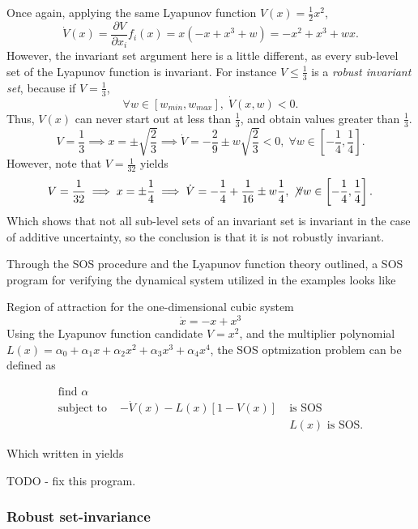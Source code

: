 Once again, applying the same Lyapunov function \(V(x) = \frac{1}{2}x^2\),
\[
  \dot{V}(x) = \frac{\partial V}{\partial x_i} f_i(x) = x(-x + x^3 + w) = -x^2 +
  x^3 + wx.
\]
However, the invariant set argument here is a little different, as every
sub-level set of the Lyapunov function is invariant. For instance \(V \leq
\frac{1}{3}\) is a \textit{robust invariant set}, because if \(V =
\frac{1}{3}\),
\[
  \forall w \in \left[ w_{min}, w_{max} \right], \; \dot{V}(x,w) < 0.
\]
Thus, \(V(x)\) can never start out at less than \(\frac{1}{3}\), and obtain
values greater than \(\frac{1}{3}\).
\[
  V = \frac{1}{3} \implies x = \pm \sqrt{\frac{2}{3}} \implies \dot{V} =
  -\frac{2}{9} \pm w \sqrt{\frac{2}{3}} < 0, \; \forall w \in \left[
    -\frac{1}{4}, \frac{1}{4} \right].
\]
However, note that \(V = \frac{1}{32}\) yields
\[
  V = \frac{1}{32} \implies x = \pm \frac{1}{4} \implies \dot{V} = -\frac{1}{4}
  + \frac{1}{16} \pm w\frac{1}{4}, \; \not \forall w \in \left[ -\frac{1}{4},
    \frac{1}{4} \right].
\]
Which shows that not all sub-level sets of an invariant set is invariant in the
case of additive uncertainty, so the conclusion is that it is not robustly
invariant.

Through the \ac{SOS} procedure and the Lyapunov function theory outlined, a
\ac{SOS} program for verifying the dynamical system utilized in the examples
looks like
\begin{example}{Region of attraction for the one-dimensional cubic system}
  \[
    \dot{x} = -x + x^3
  \]
  Using the Lyapunov function candidate \(V = x^2\), and the multiplier
  polynomial \(L(x) = \alpha_0 + \alpha_1x + \alpha_2x^2 + \alpha_3x^3 +
  \alpha_4x^4\), the \ac{SOS} optmization problem can be defined as

\begin{align*}
  \text{find } \alpha& \\
  \text{subject to }& -\dot{V}(x) - L(x)\left[ 1 - V(x) \right] \; &\text{is SOS} \\
                     & &L(x) \text{ is SOS}.
\end{align*}

Which written in \cite[Yalmip]{Lofberg2004,Lofberg2009} yields

 TODO
- fix this program.
\end{example}

\subsubsection{Robust set-invariance}

